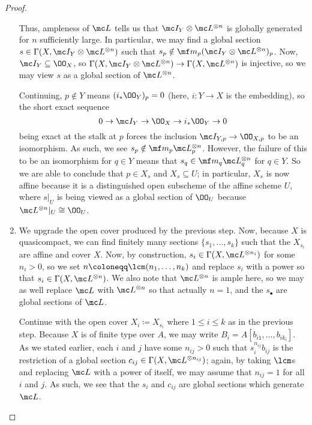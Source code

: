 \documentclass[../notes.tex]{subfiles}
\begin{document}
\begin{proof}
\begin{enumerate}
		Thus, ampleness of $\mc L$ tells us that $\mc I_Y\otimes\mc L^{\otimes n}$ is globally generated for $n$ sufficiently large. In particular, we may find a global section $s\in\Gamma(X,\mc I_Y\otimes\mc L^{\otimes n})$ such that $s_p\notin\mf m_p(\mc I_Y\otimes\mc L^{\otimes n})_p$. Now, $\mc I_Y\subseteq\OO_X$, so $\Gamma(X,\mc I_Y\otimes\mc L^{\otimes n})\to\Gamma(X,\mc L^{\otimes n})$ is injective, so we may view $s$ as a global section of $\mc L^{\otimes n}$.

		Continuing, $p\notin Y$ means $(i_*\OO_Y)_p=0$ (here, $i\colon Y\to X$ is the embedding), so the short exact sequence
		\[0\to\mc I_Y\to\OO_X\to i_*\OO_Y\to0\]
		being exact at the stalk at $p$ forces the inclusion $\mc I_{Y,p}\to\OO_{X,p}$ to be an isomorphism. As such, we see $s_p\notin\mf m_p\mc L^{\otimes n}_p$. However, the failure of this to be an isomorphism for $q\in Y$ means that $s_q\in\mf m_q\mc L^{\otimes n}_q$ for $q\in Y$. So we are able to conclude that $p\in X_s$ and $X_s\subseteq U$; in particular, $X_s$ is now affine because it is a distinguished open subscheme of the affine scheme $U$, where $s|_U$ is being viewed as a global section of $\OO_U$ because $\mc L^{\otimes n}|_U\cong\OO_U$.

		\item We upgrade the open cover produced by the previous step. Now, because $X$ is quasicompact, we can find finitely many sections $\{s_1,\ldots,s_k\}$ such that the $X_{s_i}$ are affine and cover $X$. Now, by construction, $s_i\in\Gamma(X,\mc L^{\otimes n_i})$ for some $n_i>0$, so we set $n\coloneqq\lcm(n_1,\ldots,n_k)$ and replace $s_i$ with a power so that $s_i\in\Gamma(X,\mc L^{\otimes n})$. We also note that $\mc L^{\otimes n}$ is ample here, so we may as well replace $\mc L$ with $\mc L^{\otimes n}$ so that actually $n=1$, and the $s_\bullet$ are global sections of $\mc L$.

		Continue with the open cover $X_i\coloneqq X_{s_i}$ where $1\le i\le k$ as in the previous step. Because $X$ is of finite type over $A$, we may write $B_i=A[b_{i1},\ldots,b_{ik_i}]$. As we stated earlier, each $i$ and $j$ have some $n_{ij}>0$ such that $s_i^{n_{ij}}b_{ij}$ is the restriction of a global section $c_{ij}\in\Gamma(X,\mc L^{\otimes n_{ij}})$; again, by taking $\lcm$s and replacing $\mc L$ with a power of itself, we may assume that $n_{ij}=1$ for all $i$ and $j$. As such, we see that the $s_i$ and $c_{ij}$ are global sections which generate $\mc L$.


\end{enumerate}
\end{proof}
\end{document}
